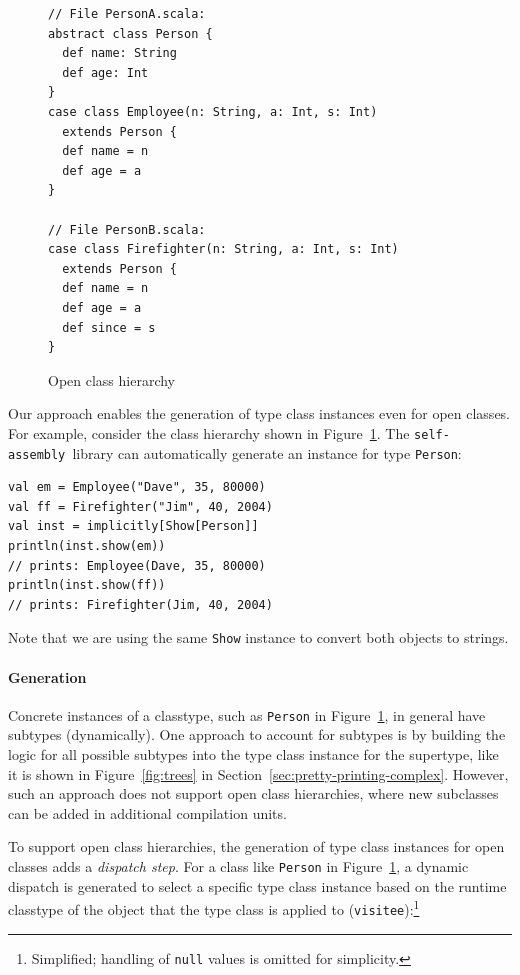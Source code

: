 \documentclass[preprint]{sigplanconf}
\newcommand{\selfassembly}{\texttt{self-assembly~}}
\begin{document}
\begin{figure}
\centering
\begin{lstlisting}
// File PersonA.scala:
abstract class Person {
  def name: String
  def age: Int
}
case class Employee(n: String, a: Int, s: Int)
  extends Person {
  def name = n
  def age = a
}

// File PersonB.scala:
case class Firefighter(n: String, a: Int, s: Int)
  extends Person {
  def name = n
  def age = a
  def since = s
}
\end{lstlisting}
  \caption{Open class hierarchy}
  \label{fig:class-hierarchy}
\end{figure}

Our approach enables the generation of type class instances even for open
classes. For example, consider the class hierarchy shown in
Figure~\ref{fig:class-hierarchy}. The \selfassembly library can automatically generate
an instance for type \verb|Person|:

\begin{lstlisting}
val em = Employee("Dave", 35, 80000)
val ff = Firefighter("Jim", 40, 2004)
val inst = implicitly[Show[Person]]
println(inst.show(em))
// prints: Employee(Dave, 35, 80000)
println(inst.show(ff))
// prints: Firefighter(Jim, 40, 2004)
\end{lstlisting}
\noindent
Note that we are using the same \verb|Show| instance to convert both objects
to strings.

\paragraph{Generation}

Concrete instances of a classtype, such as \verb|Person| in
Figure~\ref{fig:class-hierarchy}, in general have subtypes (dynamically). One approach to
account for subtypes is by building the logic for all possible subtypes into
the type class instance for the supertype, like it is shown in
Figure~\ref{fig:trees} in Section~\ref{sec:pretty-printing-complex}.
However, such an approach does not support open class hierarchies, where new subclasses can be
added in additional compilation units.

To support open class hierarchies, the generation of type class instances for
open classes adds a {\em dispatch step}. For a class like \verb|Person| in
Figure~\ref{fig:class-hierarchy}, a dynamic dispatch is generated to select a
specific type class instance based on the runtime classtype of the object that the type
class is applied to (\verb|visitee|):\footnote{Simplified; handling of \texttt{null} values is omitted for simplicity.}
\end{document}

